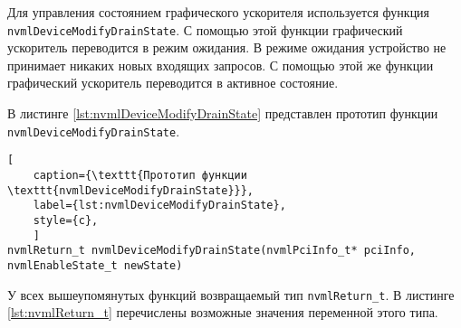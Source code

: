 Для управления состоянием графического ускорителя используется функция \texttt{nvmlDeviceModifyDrainState}. С помощью этой функции графический ускоритель переводится в режим ожидания. В режиме ожидания устройство не принимает никаких новых входящих запросов. С помощью этой же функции графический ускоритель переводится в активное состояние. 

\newpage
В листинге \ref{lst:nvmlDeviceModifyDrainState} представлен прототип функции\\ \texttt{nvmlDeviceModifyDrainState}. 

\begin{lstlisting}[
	caption={\texttt{Прототип функции \texttt{nvmlDeviceModifyDrainState}}},
	label={lst:nvmlDeviceModifyDrainState},
	style={c},
	]
nvmlReturn_t nvmlDeviceModifyDrainState(nvmlPciInfo_t* pciInfo, nvmlEnableState_t newState)
\end{lstlisting}

У всех вышеупомянутых функций возвращаемый тип \texttt{nvmlReturn\_t}. В листинге \ref{lst:nvmlReturn_t} перечислены возможные значения переменной этого типа. 

